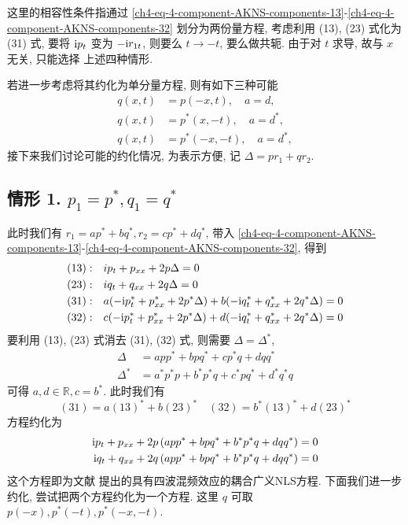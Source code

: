 \begin{remark}
    这里的相容性条件指通过 \eqref{ch4-eq-4-component-AKNS-components-13}-\eqref{ch4-eq-4-component-AKNS-components-32} 划分为两份量方程, 考虑利用 (13), (23) 式化为 (31) 式, 要将 $\mathrm{i} p_{t} $ 变为 $ - \mathrm{i} r_{1t} $, 则要么 $ t \to -t $, 要么做共轭. 由于对 $ t $ 求导, 故与 $ x $ 无关, 只能选择 上述四种情形.
\end{remark}
若进一步考虑将其约化为单分量方程, 则有如下三种可能
\begin{align}
    q(x,t) & = p(-x,t), \quad a = d, \label{ch4-eq-reduction-q1}          \\
    q(x,t) & = p^{*}(x,-t), \quad a = d^{*} \label{ch4-eq-reduction-q2},  \\
    q(x,t) & = p^{*}(-x,-t), \quad a = d^{*} \label{ch4-eq-reduction-q3},
\end{align}
接下来我们讨论可能的约化情况, 为表示方便, 记 $ \Delta = pr_{1} + qr_{2} $.
\subsection*{情形 1. $p_{1} = p^{*}, q_{1} = q^{*}$}
此时我们有 $ r_1 = ap^{*} + bq^{*}, r_2 = cp^{*} + dq^{*} $, 带入 \eqref{ch4-eq-4-component-AKNS-components-13}-\eqref{ch4-eq-4-component-AKNS-components-32}, 得到
\begin{align}
    (13): & \quad ip_{t} + p_{xx} + 2p \Delta = 0                                                                           \\
    (23): & \quad iq_{t} + q_{xx} + 2q \Delta = 0                                                                           \\
    (31): & \quad a(- \mathrm{i} p^{*}_{t} + p_{xx}^{*} + 2 p^{*} \Delta) + b(- \mathrm{i} q^{*}_{t} + q_{xx}^{*} + 2 q^{*} \Delta) = 0 \\
    (32): & \quad c(- \mathrm{i} p^{*}_{t} + p_{xx}^{*} + 2 p^{*} \Delta) + d(- \mathrm{i} q^{*}_{t} + q_{xx}^{*} + 2 q^{*} \Delta) = 0
\end{align}
要利用 (13), (23) 式消去 (31), (32) 式, 则需要 $\Delta = \Delta^{*} $,
\begin{align}
    \Delta     & = a p p^{*} + b p q^{*} + c p^{*} q + d q q^{*}                 \\
    \Delta^{*} & = a^{*} p^{*} p + b^{*} p^{*} q + c^{*} p q^{*} + d^{*} q^{*} q
\end{align}
可得 $ a, d \in \mathbb{R}, c = b^{*} $. 此时我们有
\begin{equation}
    (31) = a (13)^{*} + b (23)^{*} \quad (32) = b^{*} (13)^{*} + d (23)^{*}
\end{equation}
方程约化为
\begin{align}
    \mathrm{i} p_{t} + p_{xx} + 2p \left( a p p^{*} + b p q^{*} + b^{*} p^{*} q + d q q^{*} \right) & = 0 \label{ch4-eq-Coupled-NLS-p} \\
    \mathrm{i} q_{t} + q_{xx} + 2q \left( a p p^{*} + b p q^{*} + b^{*} p^{*} q + d q q^{*} \right) & = 0 \label{ch4-eq-Coupled-NLS-q}
\end{align}
这个方程即为文献\cite{Wang2010JMP} 提出的具有四波混频效应的耦合广义NLS方程. 下面我们进一步约化, 尝试把两个方程约化为一个方程. 这里 $ q $ 可取 $ p(-x), p^{*}(-t), p^{*}(-x,-t) $.
